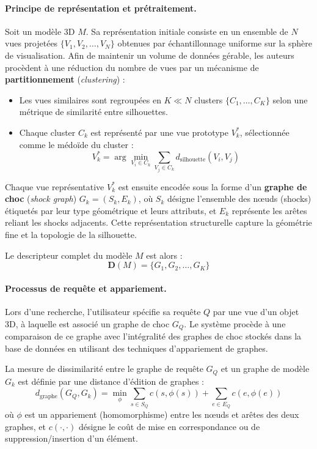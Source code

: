 \documentclass[11pt,a4paper,oneside]{report}
\begin{document}
\paragraph{Principe de représentation et prétraitement.}
Soit un modèle 3D $M$. Sa représentation initiale consiste en un ensemble de $N$ vues projetées $\{V_1, V_2, \ldots, V_N\}$ obtenues par échantillonnage uniforme sur la sphère de visualisation. Afin de maintenir un volume de données gérable, les auteurs procèdent à une réduction du nombre de vues par un mécanisme de \textbf{partitionnement} (\textit{clustering}) :

\begin{itemize}
    \item Les vues similaires sont regroupées en $K \ll N$ clusters $\{C_1, \ldots, C_K\}$ selon une métrique de similarité entre silhouettes.
    \item Chaque cluster $C_k$ est représenté par une vue prototype $V_k^*$, sélectionnée comme le médoïde du cluster :
    $$V_k^* = \arg\min_{V_i \in C_k} \sum_{V_j \in C_k} d_{\text{silhouette}}(V_i, V_j)$$
\end{itemize}

Chaque vue représentative $V_k^*$ est ensuite encodée sous la forme d'un \textbf{graphe de choc} (\textit{shock graph}) $G_k = (S_k, E_k)$, où $S_k$ désigne l'ensemble des nœuds (shocks) étiquetés par leur type géométrique et leurs attributs, et $E_k$ représente les arêtes reliant les shocks adjacents. Cette représentation structurelle capture la géométrie fine et la topologie de la silhouette.

Le descripteur complet du modèle $M$ est alors :
$$\mathbf{D}(M) = \{G_1, G_2, \ldots, G_K\}$$

\paragraph{Processus de requête et appariement.}
Lors d'une recherche, l'utilisateur spécifie sa requête $Q$ par une vue d'un objet 3D, à laquelle est associé un graphe de choc $G_Q$. Le système procède à une comparaison de ce graphe avec l'intégralité des graphes de choc stockés dans la base de données en utilisant des techniques d'appariement de graphes.

La mesure de dissimilarité entre le graphe de requête $G_Q$ et un graphe de modèle $G_k$ est définie par une distance d'édition de graphes :
$$d_{\text{graphe}}(G_Q, G_k) = \min_{\phi} \sum_{s \in S_Q} c(s, \phi(s)) + \sum_{e \in E_Q} c(e, \phi(e))$$
où $\phi$ est un appariement (homomorphisme) entre les nœuds et arêtes des deux graphes, et $c(\cdot, \cdot)$ désigne le coût de mise en correspondance ou de suppression/insertion d'un élément.
\end{document}
